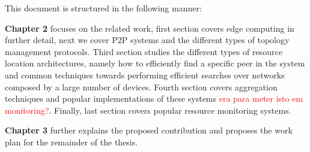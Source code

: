 This document is structured in the following manner:

\textbf{Chapter 2} focuses on the related work, first section covers edge computing in further detail, next we cover P2P systems and the different types of topology management protocols. Third section studies the different types of resource location architectures, namely how to efficiently find a specific peer in the system and common techniques towards performing efficient searches over networks composed by a large number of devices. Fourth section covers aggregation techniques and popular implementations of these systems \textcolor{red}{era para meter isto em monitoring?}. Finally, last section covers popular resource monitoring systems.

\textbf{Chapter 3} further explains the proposed contribution and proposes the work plan for the remainder of the thesis. 

